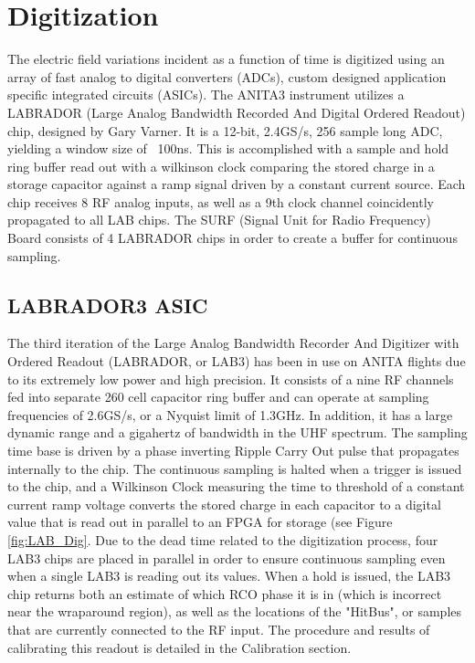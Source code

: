 	
\section{Digitization}
	The electric field variations incident as a function of time is digitized using an array of fast analog to digital converters (ADCs), custom designed application specific integrated circuits (ASICs).  The ANITA3 instrument utilizes a LABRADOR (Large Analog Bandwidth Recorded And Digital Ordered Readout) chip, designed by Gary Varner.  It is a 12-bit, 2.4GS/s, 256 sample long ADC, yielding a window size of ~100ns.  This is accomplished with a sample and hold ring buffer read out with a wilkinson clock comparing the stored charge in a storage capacitor against a ramp signal driven by a constant current source.  Each chip receives 8 RF analog inputs, as well as a 9th clock channel coincidently propagated to all LAB chips.  The SURF (Signal Unit for Radio Frequency) Board consists of 4 LABRADOR chips in order to create a buffer for continuous sampling.  

	\subsection{LABRADOR3 ASIC}
		The third iteration of the Large Analog Bandwidth Recorder And Digitizer with Ordered Readout (LABRADOR, or LAB3) has been in use on ANITA flights due to its extremely low power and high precision.  It consists of a nine RF channels fed into separate 260 cell capacitor ring buffer and can operate at sampling frequencies of 2.6GS/s, or a Nyquist limit of 1.3GHz.  In addition, it has a large dynamic range and a gigahertz of bandwidth in the UHF spectrum.  The sampling time base is driven by a phase inverting Ripple Carry Out pulse that propagates internally to the chip.  The continuous sampling is halted when a trigger is issued to the chip, and a Wilkinson Clock measuring the time to threshold of a constant current ramp voltage converts the stored charge in each capacitor to a digital value that is read out in parallel to an FPGA for storage (see Figure \ref{fig:LAB_Dig}.  Due to the dead time related to the digitization process, four LAB3 chips are placed in parallel in order to ensure continuous sampling even when a single LAB3 is reading out its values.  When a hold is issued, the LAB3 chip returns both an estimate of which RCO phase it is in (which is incorrect near the wraparound region), as well as the locations of the "HitBus", or samples that are currently connected to the RF input. The procedure and results of calibrating this readout is detailed in the Calibration section.
		

